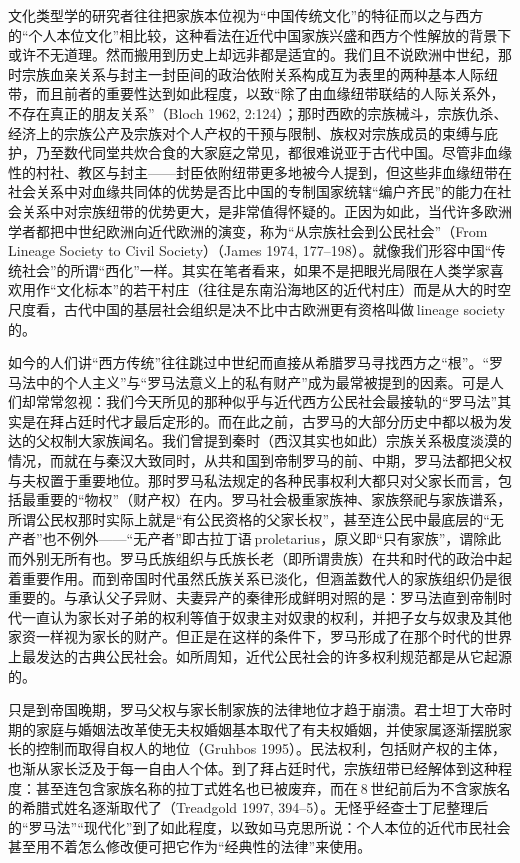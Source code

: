 \documentclass[a4paper,12pt,punct=kaiming]{ctexart}
\begin{document}
文化类型学的研究者往往把家族本位视为“中国传统文化”的特征而以之与西方的“个人本位文化”相比较，这种看法在近代中国家族兴盛和西方个性解放的背景下或许不无道理。然而搬用到历史上却远非都是适宜的。我们且不说欧洲中世纪，那时宗族血亲关系与封主一封臣间的政治依附关系构成互为表里的两种基本人际纽带，而且前者的重要性达到如此程度，以致“除了由血缘纽带联结的人际关系外，不存在真正的朋友关系”（Bloch 1962, 2:124）；那时西欧的宗族械斗，宗族仇杀、经济上的宗族公产及宗族对个人产权的干预与限制、族权对宗族成员的束缚与庇护，乃至数代同堂共炊合食的大家庭之常见，都很难说亚于古代中国。尽管非血缘性的村社、教区与封主——封臣依附纽带更多地被今人提到，但这些非血缘纽带在社会关系中对血缘共同体的优势是否比中国的专制国家统辖“编户齐民”的能力在社会关系中对宗族纽带的优势更大，是非常值得怀疑的。正因为如此，当代许多欧洲学者都把中世纪欧洲向近代欧洲的演变，称为“从宗族社会到公民社会”（From Lineage Society to Civil Society）（James 1974, 177–198）。就像我们形容中国“传统社会”的所谓“西化”一样。其实在笔者看来，如果不是把眼光局限在人类学家喜欢用作“文化标本”的若干村庄（往往是东南沿海地区的近代村庄）而是从大的时空尺度看，古代中国的基层社会组织是决不比中古欧洲更有资格叫做 lineage society 的。

如今的人们讲“西方传统”往往跳过中世纪而直接从希腊罗马寻找西方之“根”。“罗马法中的个人主义”与“罗马法意义上的私有财产”成为最常被提到的因素。可是人们却常常忽视：我们今天所见的那种似乎与近代西方公民社会最接轨的“罗马法”其实是在拜占廷时代才最后定形的。而在此之前，古罗马的大部分历史中都以极为发达的父权制大家族闻名。我们曾提到秦时（西汉其实也如此）宗族关系极度淡漠的情况，而就在与秦汉大致同时，从共和国到帝制罗马的前、中期，罗马法都把父权与夫权置于重要地位。那时罗马私法规定的各种民事权利大都只对父家长而言，包括最重要的“物权”（财产权）在内。罗马社会极重家族神、家族祭祀与家族谱系，所谓公民权那时实际上就是“有公民资格的父家长权”，甚至连公民中最底层的“无产者”也不例外——“无产者”即古拉丁语 proletarius，原义即“只有家族”，谓除此而外别无所有也。罗马氏族组织与氏族长老（即所谓贵族）在共和时代的政治中起着重要作用。而到帝国时代虽然氏族关系已淡化，但涵盖数代人的家族组织仍是很重要的。与承认父子异财、夫妻异产的秦律形成鲜明对照的是：罗马法直到帝制时代一直认为家长对子弟的权利等值于奴隶主对奴隶的权利，并把子女与奴隶及其他家资一样视为家长的财产。但正是在这样的条件下，罗马形成了在那个时代的世界上最发达的古典公民社会。如所周知，近代公民社会的许多权利规范都是从它起源的。

只是到帝国晚期，罗马父权与家长制家族的法律地位才趋于崩溃。君士坦丁大帝时期的家庭与婚姻法改革使无夫权婚姻基本取代了有夫权婚姻，并使家属逐渐摆脱家长的控制而取得自权人的地位（Gruhbos 1995）。民法权利，包括财产权的主体，也渐从家长泛及于每一自由人个体。到了拜占廷时代，宗族纽带已经解体到这种程度：甚至连包含家族名称的拉丁式姓名也已被废弃，而在 8 世纪前后为不含家族名的希腊式姓名逐渐取代了（Treadgold 1997, 394–5）。无怪乎经查士丁尼整理后的“罗马法”“现代化”到了如此程度，以致如马克思所说：个人本位的近代市民社会甚至用不着怎么修改便可把它作为“经典性的法律”来使用。
\end{document}
